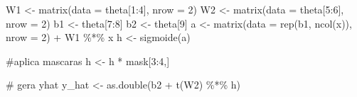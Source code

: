 \documentclass[
  a4paperpaper,
]{article}
\newenvironment{Shaded}{\begin{snugshade}}{\end{snugshade}}
\newcommand{\AttributeTok}[1]{\textcolor[rgb]{0.40,0.45,0.13}{#1}}
\newcommand{\CommentTok}[1]{\textcolor[rgb]{0.37,0.37,0.37}{#1}}
\newcommand{\DecValTok}[1]{\textcolor[rgb]{0.68,0.00,0.00}{#1}}
\newcommand{\FunctionTok}[1]{\textcolor[rgb]{0.28,0.35,0.67}{#1}}
\newcommand{\NormalTok}[1]{\textcolor[rgb]{0.00,0.23,0.31}{#1}}
\newcommand{\OtherTok}[1]{\textcolor[rgb]{0.00,0.23,0.31}{#1}}
\newcommand{\SpecialCharTok}[1]{\textcolor[rgb]{0.37,0.37,0.37}{#1}}
\begin{document}
\begin{Shaded}
\begin{Highlighting}[]
\NormalTok{  W1 }\OtherTok{\textless{}{-}} \FunctionTok{matrix}\NormalTok{(}\AttributeTok{data =}\NormalTok{ theta[}\DecValTok{1}\SpecialCharTok{:}\DecValTok{4}\NormalTok{], }\AttributeTok{nrow =} \DecValTok{2}\NormalTok{)}
\NormalTok{  W2 }\OtherTok{\textless{}{-}} \FunctionTok{matrix}\NormalTok{(}\AttributeTok{data =}\NormalTok{ theta[}\DecValTok{5}\SpecialCharTok{:}\DecValTok{6}\NormalTok{], }\AttributeTok{nrow =} \DecValTok{2}\NormalTok{)}
\NormalTok{  b1 }\OtherTok{\textless{}{-}}\NormalTok{ theta[}\DecValTok{7}\SpecialCharTok{:}\DecValTok{8}\NormalTok{]}
\NormalTok{  b2 }\OtherTok{\textless{}{-}}\NormalTok{ theta[}\DecValTok{9}\NormalTok{]}
\NormalTok{  a }\OtherTok{\textless{}{-}} \FunctionTok{matrix}\NormalTok{(}\AttributeTok{data =} \FunctionTok{rep}\NormalTok{(b1, }\FunctionTok{ncol}\NormalTok{(x)), }\AttributeTok{nrow =} \DecValTok{2}\NormalTok{) }\SpecialCharTok{+}\NormalTok{ W1 }\SpecialCharTok{\%*\%}\NormalTok{ x}
\NormalTok{  h }\OtherTok{\textless{}{-}} \FunctionTok{sigmoide}\NormalTok{(a)}
    
  \CommentTok{\#aplica mascaras}
\NormalTok{    h }\OtherTok{\textless{}{-}}\NormalTok{ h }\SpecialCharTok{*}\NormalTok{ mask[}\DecValTok{3}\SpecialCharTok{:}\DecValTok{4}\NormalTok{,]}
  
  \CommentTok{\# gera yhat}
\NormalTok{  y\_hat }\OtherTok{\textless{}{-}} \FunctionTok{as.double}\NormalTok{(b2 }\SpecialCharTok{+} \FunctionTok{t}\NormalTok{(W2) }\SpecialCharTok{\%*\%}\NormalTok{ h)}
  

\end{Highlighting}
\end{Shaded}
\end{document}
